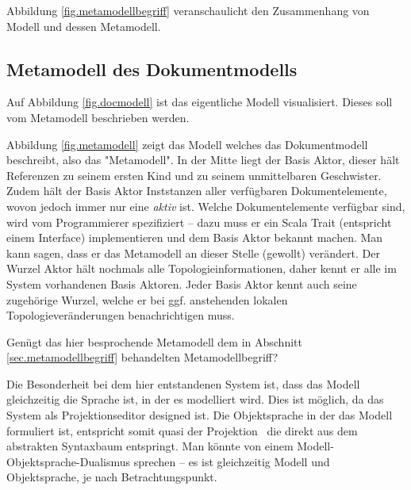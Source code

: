 Abbildung \ref{fig.metamodellbegriff} veranschaulicht den Zusammenhang von
Modell und dessen Metamodell.



\subsection{Metamodell des Dokumentmodells}\label{sec.meta}

Auf Abbildung \ref{fig.docmodell} ist das eigentliche Modell visualisiert.
Dieses soll vom Metamodell beschrieben werden.


Abbildung \ref{fig.metamodell} zeigt das Modell welches das Dokumentmodell beschreibt,
also das "Metamodell".
In der Mitte liegt der Basis Aktor, dieser hält Referenzen zu seinem ersten Kind
und zu seinem unmittelbaren Geschwister.
Zudem hält der Basis Aktor Inststanzen aller verfügbaren Dokumentelemente,
wovon jedoch immer nur eine \emph{aktiv} ist.
Welche Dokumentelemente verfügbar sind, wird vom Programmierer spezifiziert -- dazu
muss er ein Scala Trait (entspricht einem Interface) implementieren und dem
Basis Aktor bekannt machen.
Man kann sagen, dass er das Metamodell an dieser Stelle (gewollt) verändert.
Der Wurzel Aktor hält nochmals alle Topologieinformationen, daher kennt er
alle im System vorhandenen Basis Aktoren.
Jeder Basis Aktor kennt auch seine zugehörige Wurzel, welche er bei ggf. anstehenden
lokalen Topologieveränderungen benachrichtigen muss.


Genügt das hier besprochende Metamodell dem in Abschnitt
\ref{sec.metamodellbegriff} behandelten Metamodellbegriff?

Die Besonderheit bei dem hier entstandenen System ist, dass das
Modell gleichzeitig die Sprache ist, in der es modelliert wird.
Dies ist möglich, da das System als Projektionseditor designed ist.
Die Objektsprache in der das Modell formuliert ist,
entspricht somit quasi der Projektion
~die direkt aus dem abstrakten Syntaxbaum entspringt.
Man könnte von einem Modell-Objektsprache-Dualismus sprechen --
es ist gleichzeitig Modell und Objektsprache, je nach Betrachtungspunkt.

